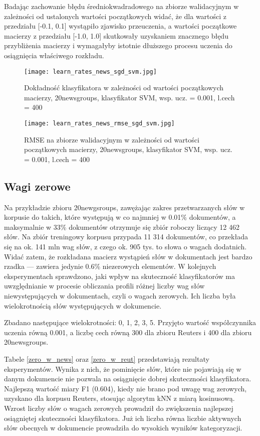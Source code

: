 \documentclass{pracamgr}
\begin{document}
Badając zachowanie błędu średniokwadradowego na zbiorze walidacyjnym w zależności od ustalonych wartości początkowych widać, że dla wartości z przedziału [-0.1, 0.1] wystąpiło zjawisko przeuczenia, a wartości początkowe macierzy z przedziału [-1.0, 1.0] skutkowały uzyskaniem znacznego błędu przybliżenia macierzy i wymagałyby istotnie dłuższego procesu uczenia do osiągnięcia właściwego rozkładu.

\begin{figure}[]
  \texttt{[image: learn\_rates\_news\_sgd\_svm.jpg]}
  \caption{Dokładność klasyfikatora w zależności od wartości początkowych macierzy, 20newsgroups, klasyfikator SVM, wsp. ucz. = 0.001, l.cech = 400}\label{fig:initial_vals_accuracy}
\endminipage\hfill
{}%
  \texttt{[image: learn\_rates\_news\_rmse\_sgd\_svm.jpg]}
  \caption{RMSE na zbiorze walidacyjnym w zależności od wartości początkowych macierzy, 20newsgroups, klasyfikator SVM, wsp. ucz. = 0.001, l.cech = 400}\label{fig:initial_vals_rmse}
\endminipage\hfill
\end{figure}

\subsection{Wagi zerowe}

Na przykładzie zbioru 20newgsroups, zawężając zakres przetwarzanych słów w korpusie do takich, które występują w co najmniej w 0.01\% dokumentów, a maksymalnie w 33\% dokumentów otrzymuje się zbiór roboczy liczący 12 462 słów. Na zbiór treningowy korpusu przypada 11 314 dokumentów, co przekłada się na ok. 141 mln wag słów, z czego ok. 905 tys. to słowa o wagach dodatnich. Widać zatem, że rozkładana macierz wystąpień słów w dokumentach jest bardzo rzadka --- zawiera jedynie 0.6\% niezerowych elementów. W kolejnych eksperymentach sprawdzono, jaki wpływ na skuteczność klasyfikatorów ma uwzględnianie w procesie obliczania profili różnej liczby wag słów niewystępujących w dokumentach, czyli o wagach zerowych. Ich liczba była wielokrotnością słów występujących w dokumencie. 

Zbadano następujące wielokrotności: 0, 1, 2, 3, 5. Przyjęto wartość współczynnika uczenia równą 0.001, a liczbę cech równą 300 dla zbioru Reuters i 400 dla zbioru 20newsgroups.

Tabele \ref{zero_w_news} oraz \ref{zero_w_reut} przedstawiają rezultaty eksperymentów. Wynika z nich, że pominięcie słów, które nie pojawiają się w danym dokumencie nie pozwala na osiągnięcie dobrej skuteczności klasyfikatora. Najlepszą wartość miary F1 (0.604), kiedy nie brano pod uwagę wag zerowych, uzyskano dla korpusu Reuters, stosując algorytm kNN z miarą kosinusową. Wzrost liczby słów o wagach zerowych prowadził do zwiększenia najlepszej osiągniętej skuteczności klasyfikatora. Już ich liczba równa liczbie aktywnych słów obecnych w dokumencie prowadziła do wysokich wyników kategoryzacji.
\end{document}
